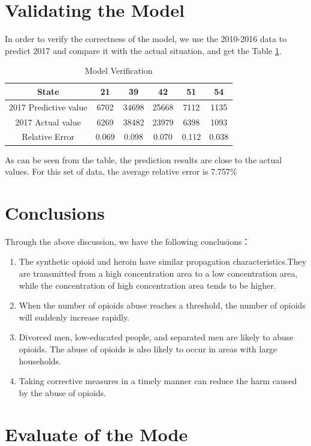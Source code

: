 \documentclass[12pt]{mcmthesis}
\begin{document}
\section{Validating the Model}
In order to verify the correctness of the model, we use the 2010-2016 data to predict 2017 and compare it with the actual situation, and get the Table \ref{yanzheng}.\par
\begin{table}
  \centering  \caption{Model Verification}\label{yanzheng}
  \begin{tabular}{|c|c|c|c|c|c|}
\hline
State                 & 21    & 39    & 42    & 51    & 54    \\ \hline
2017 Predictive value & 6702  & 34698 & 25668 & 7112  & 1135  \\ \hline
2017 Actual value     & 6269  & 38482 & 23979 & 6398  & 1093  \\ \hline
Relative Error        & 0.069 & 0.098 & 0.070 & 0.112 & 0.038 \\ \hline
  \end{tabular}
\end{table}
As can be seen from the table, the prediction results are close to the actual values. For this set of data, the average relative error is 7.757\%
\section{Conclusions}
Through the above discussion, we have the following conclusions：
\begin{enumerate}
  \item The synthetic opioid and heroin have similar propagation characteristics.They are transmitted from a high concentration area to a low concentration area, while the concentration of high concentration area tends to be higher.
  \item When the number of opioids abuse reaches a threshold, the number of opioids will suddenly increase rapidly.
  \item Divorced men, low-educated people, and separated men are likely to abuse opioids. The abuse of opioids is also likely to occur in areas with large households.
  \item Taking corrective measures in a timely manner can reduce the harm caused by the abuse of opioids.
\end{enumerate}
\section{Evaluate of the Mode}
\end{document}
